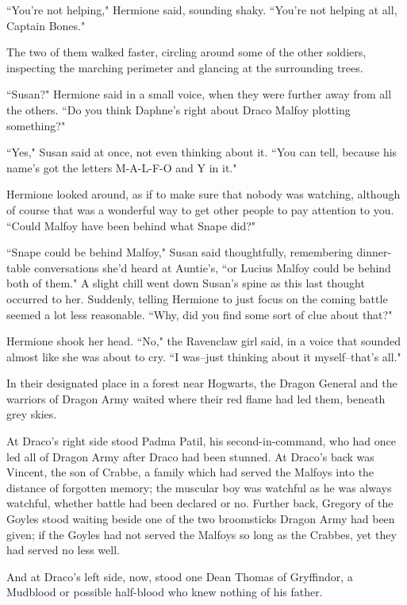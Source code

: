 ``You're not helping," Hermione said, sounding shaky. ``You're not helping at all, Captain Bones."

The two of them walked faster, circling around some of the other soldiers, inspecting the marching perimeter and glancing at the surrounding trees.

``Susan?" Hermione said in a small voice, when they were further away from all the others. ``Do you think Daphne's right about Draco Malfoy plotting something?"

``Yes," Susan said at once, not even thinking about it. ``You can tell, because his name's got the letters M-A-L-F-O and Y in it."

Hermione looked around, as if to make sure that nobody was watching, although of course that was a wonderful way to get other people to pay attention to you. ``Could Malfoy have been behind what Snape did?"

``Snape could be behind Malfoy," Susan said thoughtfully, remembering dinner-table conversations she'd heard at Auntie's, ``or Lucius Malfoy could be behind both of them." A slight chill went down Susan's spine as this last thought occurred to her. Suddenly, telling Hermione to just focus on the coming battle seemed a lot less reasonable. ``Why, did you find some sort of clue about that?"

Hermione shook her head. ``No," the Ravenclaw girl said, in a voice that sounded almost like she was about to cry. ``I was\---just thinking about it myself\---that's all."

\later

In their designated place in a forest near Hogwarts, the Dragon General and the warriors of Dragon Army waited where their red flame had led them, beneath grey skies.

At Draco's right side stood Padma Patil, his second-in-command, who had once led all of Dragon Army after Draco had been stunned. At Draco's back was Vincent, the son of Crabbe, a family which had served the Malfoys into the distance of forgotten memory; the muscular boy was watchful as he was always watchful, whether battle had been declared or no. Further back, Gregory of the Goyles stood waiting beside one of the two broomsticks Dragon Army had been given; if the Goyles had not served the Malfoys so long as the Crabbes, yet they had served no less well.

And at Draco's left side, now, stood one Dean Thomas of Gryffindor, a Mudblood or possible half-blood who knew nothing of his father.

